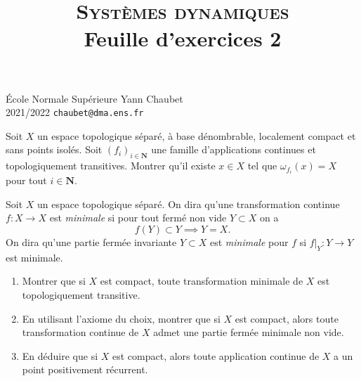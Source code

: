 \documentclass[a4paper,10pt,openany]{article}
\title{\textsc{Syst\`emes dynamiques} \\ Feuille d'exercices 2}
\date{}
\author{}
\theoremstyle{plain}
\theoremstyle{definition}
\newcommand{\N}{\mathbf{N}}
\begin{document}
{\noindent \'Ecole Normale Sup\'erieure  \hfill Yann Chaubet } \\
{2021/2022 \hfill \texttt{chaubet@dma.ens.fr}}

{\let\newpage\relax\maketitle}
\maketitle
{} \vspace{0.15cm}

\noindent Soit $X$ un espace topologique s\'epar\'e, \`a base d\'enombrable, localement compact et sans points isol\'es.  Soit $(f_i)_{i \in \N}$ une famille d'applications continues et topologiquement transitives. Montrer qu'il existe $x \in X$ tel que $\omega_{f_i}(x) = X$ pour tout $i \in \N$.

\vspace{0.6cm}

 \vspace{1.5mm}

\noindent Soit $X$ un espace topologique s\'epar\'e. On dira qu'une transformation continue $f : X \to X$ est \textit{minimale} si 
pour tout ferm\'e non vide $Y \subset X$ on a 
$$
f(Y) \subset Y \implies Y = X.
$$
On dira qu'une partie ferm\'ee invariante $Y \subset X$ est \textit{minimale} pour $f$ si $f|_Y : Y \to Y$ est minimale.
\begin{enumerate}
\item Montrer que si $X$ est compact, toute transformation minimale de $X$ est topologiquement transitive.
\item En utilisant l'axiome du choix, montrer que si $X$ est compact, alors toute transformation continue de $X$ admet une partie ferm\'ee minimale non vide.
\item En d\'eduire que si $X$ est compact, alors toute application continue de $X$ a un point positivement r\'ecurrent.
\end{enumerate}
\vspace{0.6cm}

 \vspace{1.5mm} 
\end{document}
